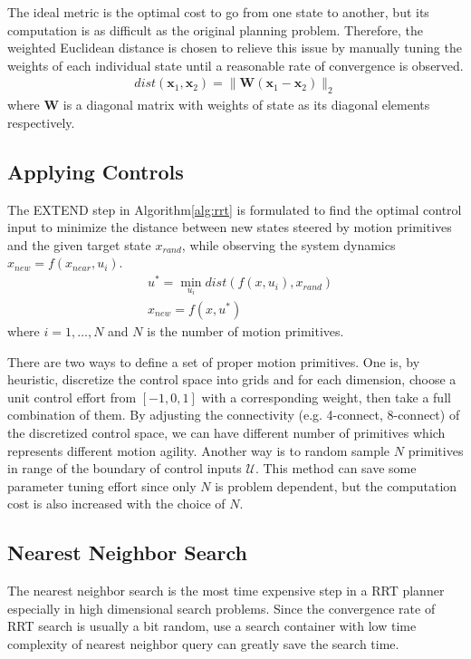 \documentclass[11pt, conference]{IEEEtran}
\begin{document}
The ideal metric is the optimal cost to go from one state to another, but its computation is as difficult as the original planning problem.
Therefore, the weighted Euclidean distance is chosen to relieve this issue by manually tuning the weights of each individual state until a reasonable rate of convergence is observed.
\begin{align}
    dist(\mathbf{x}_1, \mathbf{x}_2) = \|\mathbf{W}(\mathbf{x}_1 - \mathbf{x}_2)\|_2
\end{align}
where $\mathbf{W}$ is a diagonal matrix with weights of state as its diagonal elements respectively.

\subsection{Applying Controls}

The EXTEND step in Algorithm\ref{alg:rrt} is formulated to find the optimal control input to minimize the distance between new states steered by motion primitives and the given target state $x_{rand}$, while observing the system dynamics $x_{new} = f(x_{near}, u_i)$.
\begin{align}
    &{u}^* = \min_{{u}_i} dist(f({x}, {u}_i), {x}_{rand})\\
    &{x}_{new} = f({x}, {u}^*) 
\end{align}
where $i=1, \dots, N$ and $N$ is the number of motion primitives. 

There are two ways to define a set of proper motion primitives.
One is, by heuristic, discretize the control space into grids and for each dimension, choose a unit control effort from $[-1, 0, 1]$ with a corresponding weight, then take a full combination of them. By adjusting the connectivity (e.g. 4-connect, 8-connect) of the discretized control space, we can have different number of primitives which represents different motion agility. Another way is to random sample $N$ primitives in range of the boundary of control inputs $\mathcal{U}$\cite{hauser2020robotic}. This method can save some parameter tuning effort since only $N$ is problem dependent, but the computation cost is also increased with the choice of $N$.

\subsection{Nearest Neighbor Search}

The nearest neighbor search is the most time expensive step in a RRT planner especially in high dimensional search problems. Since the convergence rate of RRT search is usually a bit random, use a search container with low time complexity of nearest neighbor query can greatly save the search time.
\end{document}
